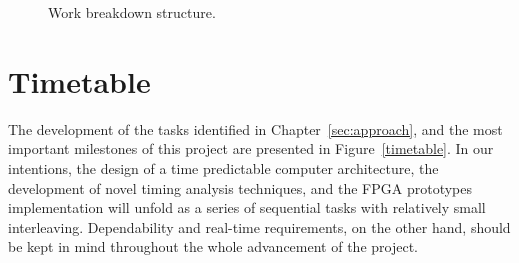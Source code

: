 \begin{figure}[h]
\caption{Work breakdown structure.}
\label{wbs}
\end{figure}

\newpage
\section{Timetable}
The development of the tasks identified in Chapter~\ref{sec:approach}, and the most important milestones of this project are presented in Figure~\ref{timetable}.
In our intentions, the design of a time predictable computer architecture, the development of novel timing analysis techniques, and the FPGA prototypes implementation will unfold as a series of sequential tasks with relatively small interleaving. Dependability and real-time requirements, on the other hand, should be kept in mind throughout the whole advancement of the project.

